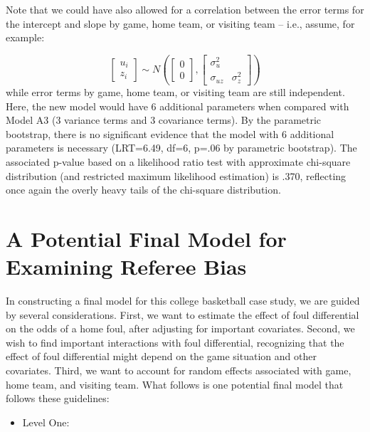 \documentclass[
]{krantz}
\providecommand{\tightlist}{%
  \setlength{\itemsep}{0pt}\setlength{\parskip}{0pt}}
\begin{document}
Note that we could have also allowed for a correlation between the error terms for the intercept and slope by game, home team, or visiting team -- i.e., assume, for example:

\[ \left[ \begin{array}{c}
            u_{i} \\ z_{i}
          \end{array}  \right] \sim N \left( \left[
          \begin{array}{c}
            0 \\ 0
          \end{array} \right], \left[
          \begin{array}{cc}
            \sigma_{u}^{2} & \\
            \sigma_{uz} & \sigma_{z}^{2}
          \end{array} \right] \right) \]
while error terms by game, home team, or visiting team are still independent. Here, the new model would have 6 additional parameters when compared with Model A3 (3 variance terms and 3 covariance terms). By the parametric bootstrap, there is no significant evidence that the model with 6 additional parameters is necessary (LRT=6.49, df=6, p=.06 by parametric bootstrap). The associated p-value based on a likelihood ratio test with approximate chi-square distribution (and restricted maximum likelihood estimation) is .370, reflecting once again the overly heavy tails of the chi-square distribution.

\hypertarget{sec:finalmodel-glmm}{%
\section{A Potential Final Model for Examining Referee Bias}\label{sec:finalmodel-glmm}}

In constructing a final model for this college basketball case study, we are guided by several considerations. First, we want to estimate the effect of foul differential on the odds of a home foul, after adjusting for important covariates. Second, we wish to find important interactions with foul differential, recognizing that the effect of foul differential might depend on the game situation and other covariates. Third, we want to account for random effects associated with game, home team, and visiting team. What follows is one potential final model that follows these guidelines:

\begin{itemize}
\tightlist
\item
  Level One:
\end{itemize}
\end{document}

